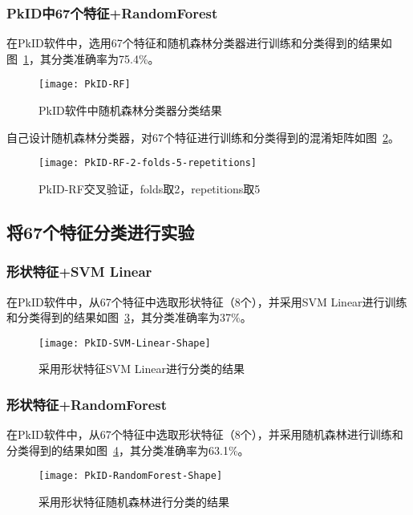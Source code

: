 \subsubsection{PkID中67个特征+RandomForest}
在PkID软件中，选用67个特征和随机森林分类器进行训练和分类得到的结果如图~\ref{fig:PkID-RF}，其分类准确率为75.4\%。

\begin{figure}[!ht]
\centering
\texttt{[image: PkID-RF]}
\caption{PkID软件中随机森林分类器分类结果}
\label{fig:PkID-RF}
\end{figure}

自己设计随机森林分类器，对67个特征进行训练和分类得到的混淆矩阵如图~\ref{fig: PkID-RF-2-folds-5-repetitions}。
\begin{figure}[!ht]
\centering
\texttt{[image: PkID-RF-2-folds-5-repetitions]}
\caption{PkID-RF交叉验证，folds取2，repetitions取5}
\label{fig: PkID-RF-2-folds-5-repetitions}
\end{figure}

\subsection{将67个特征分类进行实验}
\subsubsection{形状特征+SVM Linear}
在PkID软件中，从67个特征中选取形状特征（8个），并采用SVM Linear进行训练和分类得到的结果如图~\ref{fig:PkID-SVM-Linear-Shape}，其分类准确率为37\%。
\begin{figure}[!ht]
\centering
\texttt{[image: PkID-SVM-Linear-Shape]}
\caption{采用形状特征SVM Linear进行分类的结果}
\label{fig:PkID-SVM-Linear-Shape}
\end{figure}

\subsubsection{形状特征+RandomForest}
在PkID软件中，从67个特征中选取形状特征（8个），并采用随机森林进行训练和分类得到的结果如图~\ref{fig:PkID-RandomForest-Shape}，其分类准确率为63.1\%。

\begin{figure}[!ht]
\centering
\texttt{[image: PkID-RandomForest-Shape]}
\caption{采用形状特征随机森林进行分类的结果}
\label{fig:PkID-RandomForest-Shape}
\end{figure}

